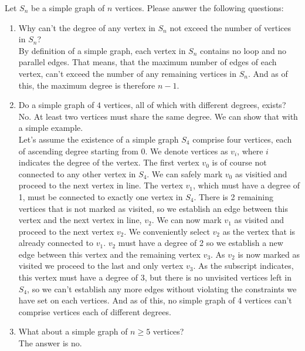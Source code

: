 \documentclass{report}
\newcommand{\defaultEnumerateLabel}{\textbf{\alph*.}}
\begin{document}
	Let $S_n$ be a simple graph of $n$ vertices. Please answer the following questions:
	\begin{enumerate}[label=\defaultEnumerateLabel]
		\item Why can't the degree of any vertex in $S_n$ not exceed the number of vertices in $S_n$?\\
		
		By definition of a simple graph, each vertex in $S_n$ contains no loop and no parallel edges. That means, that the maximum number of edges of each vertex, can't exceed the number of any remaining vertices in $S_n$. And as of this, the maximum degree is therefore $n-1$.
		
		\item Do a simple graph of $4$ vertices, all of which with different degrees, exists?\\
		
		No. At least two vertices must share the same degree. We can show that with a simple example.\\
		
		Let's assume the existence of a simple graph $S_4$ comprise four vertices, each of ascending degree starting from 0. We denote vertices as $v_i$, where $i$ indicates the degree of the vertex. The first vertex $v_0$ is of course not connected to any other vertex in $S_4$. We can safely mark $v_0$ as visitied and proceed to the next vertex in line. The vertex $v_1$, which must have a degree of 1, must be connected to exactly one vertex in $S_4$. There is 2 remaining vertices that is not marked as visited, so we establish an edge between this vertex and the next vertex in line, $v_2$. We can now mark $v_1$ as visited and proceed to the next vertex $v_2$. We conveniently select $v_2$ as the vertex that is already connected to $v_1$. $v_2$ must have a degree of 2 so we establish a new edge between this vertex and the remaining vertex $v_3$. As $v_2$ is now marked as visited we proceed to the last and only vertex $v_3$. As the subscript indicates, this vertex must have a degree of 3, but there is no unvisited vertices left in $S_4$, so we can't establish any more edges without violating the constraints we have set on each vertices. And as of this, no simple graph of 4 vertices can't comprise vertices each of different degrees.
		
		\item What about a simple graph of $n\geq 5$ vertices?\\
		
		The answer is no.\\
		

\end{enumerate}
\end{document}
